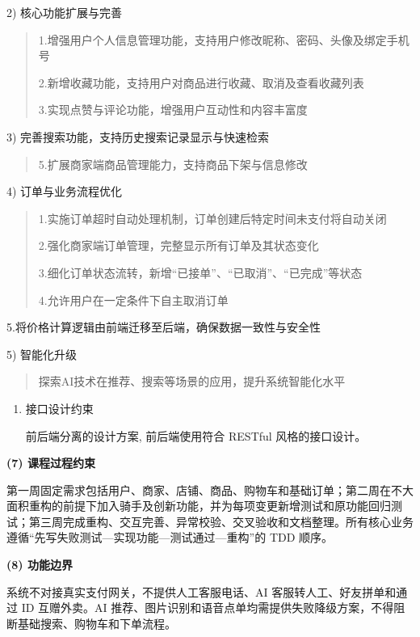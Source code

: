 2) 核心功能扩展与完善

\begin{quote}
1.增强用户个人信息管理功能，支持用户修改昵称、密码、头像及绑定手机号

2.新增收藏功能，支持用户对商品进行收藏、取消及查看收藏列表

3.实现点赞与评论功能，增强用户互动性和内容丰富度
\end{quote}

3) 完善搜索功能，支持历史搜索记录显示与快速检索

\begin{quote}
5.扩展商家端商品管理能力，支持商品下架与信息修改
\end{quote}

4) 订单与业务流程优化

\begin{quote}
1.实施订单超时自动处理机制，订单创建后特定时间未支付将自动关闭

2.强化商家端订单管理，完整显示所有订单及其状态变化

3.细化订单状态流转，新增``已接单''、``已取消''、``已完成''等状态

4.允许用户在一定条件下自主取消订单
\end{quote}

5.将价格计算逻辑由前端迁移至后端，确保数据一致性与安全性

5) 智能化升级

\begin{quote}
探索AI技术在推荐、搜索等场景的应用，提升系统智能化水平
\end{quote}

\begin{enumerate}
\def\labelenumi{\arabic{enumi})}
\setcounter{enumi}{5}
\item
  接口设计约束

  前后端分离的设计方案, 前后端使用符合 RESTful 风格的接口设计。
\end{enumerate}

{\color{red}
\textbf{(7) 课程过程约束}

第一周固定需求包括用户、商家、店铺、商品、购物车和基础订单；第二周在不大面积重构的前提下加入骑手及创新功能，并为每项变更新增测试和原功能回归测试；第三周完成重构、交互完善、异常校验、交叉验收和文档整理。所有核心业务遵循``先写失败测试---实现功能---测试通过---重构''的 TDD 顺序。

\textbf{(8) 功能边界}

系统不对接真实支付网关，不提供人工客服电话、AI 客服转人工、好友拼单和通过 ID 互赠外卖。AI 推荐、图片识别和语音点单均需提供失败降级方案，不得阻断基础搜索、购物车和下单流程。
}

